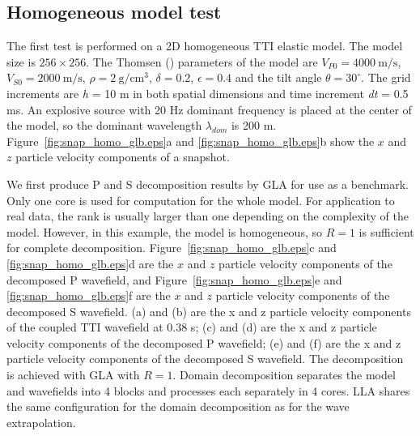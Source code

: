 \documentclass[manuscript,ulem,graphix,revised]{geophysics}
\begin{document}
\subsection{Homogeneous model test}
\indent\indent
The first test is performed on a 2D homogeneous TTI elastic model. The model size is $256 \times 256$. The Thomsen (\citeyear{leon86}) parameters of the model are $V_{P0}=4000~\mathrm{m/s}$, $V_{S0}=2000~\mathrm{m/s}$, $\rho=2~\mathrm{g/cm^3}$, $\delta=0.2$, $\epsilon=0.4$ and the tilt angle $\theta=30^\circ$. The grid increments are \textit{h} = 10 m in both spatial dimensions and time increment \textit{dt} = 0.5 ms. An explosive source with 20 Hz dominant frequency is placed at the center of the model, so the dominant wavelength $\lambda_{dom}$ is 200 m. Figure~\ref{fig:snap_homo_glb.eps}a and \ref{fig:snap_homo_glb.eps}b show the $x$ and $z$ particle velocity components of a snapshot. 

We first produce P and S decomposition results by GLA for use as a benchmark. Only one core is used for computation for the whole model. For application to real data, the rank is usually larger than one depending on the complexity of the model. However, in this example, the model is homogeneous, so $R=1$ is sufficient for complete decomposition.
Figure~\ref{fig:snap_homo_glb.eps}c and \ref{fig:snap_homo_glb.eps}d are the $x$ and $z$ particle velocity components of the decomposed P wavefield, and Figure~\ref{fig:snap_homo_glb.eps}e and \ref{fig:snap_homo_glb.eps}f are the $x$ and $z$ particle velocity components of the decomposed S wavefield.
{(a) and (b) are the x and z particle velocity components of the coupled TTI wavefield at 0.38 s; (c) and (d) are the x and z particle velocity components of the decomposed P wavefield; (e) and (f) are the x and z particle velocity components of the decomposed S wavefield. The decomposition is achieved with GLA with $R=1$.}
{
Domain decomposition separates the model and wavefields into 4 blocks and processes each separately in 4 cores. LLA shares the same configuration for the domain decomposition as for the wave extrapolation.
}
\end{document}
